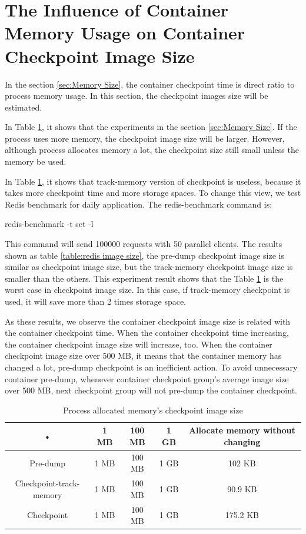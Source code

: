 \section{The Influence of Container Memory Usage on Container Checkpoint Image Size}
In the section \ref{sec:Memory Size}, the container checkpoint time is direct ratio to process memory usage. In this section, the checkpoint images size will be estimated.

In Table \ref{table:process image size}, it shows that the experiments in the section \ref{sec:Memory Size}. If the process uses more memory, the checkpoint image size will be larger. However, although process allocates memory a lot, the checkpoint size still small unless the memory be used.

In Table \ref{table:process image size}, it shows that track-memory version of checkpoint is useless, because it takes more checkpoint time and more storage spaces. To change this view, we test Redis benchmark for daily application. The redis-benchmark command is:
\begin{center}
redis-benchmark -t set -l
\end{center}
This command will send 100000 requests with 50 parallel clients. The results shown as table \ref{table:redis image size}, the pre-dump checkpoint image size is similar as checkpoint image size, but the track-memory checkpoint image size is smaller than the others. This experiment result shows that the Table \ref{table:process image size} is the worst case in checkpoint image size. In this case, if track-memory checkpoint is used, it will save more than 2 times storage space.

As these results, we observe the container checkpoint image size is related with the container checkpoint time.
When the container checkpoint time increasing, the container checkpoint image size will increase, too.
When the container checkpoint image size over 500 MB, it means that the container memory has changed a lot, pre-dump checkpoint is an inefficient action.
To avoid unnecessary container pre-dump, whenever container checkpoint group's average image size over 500 MB, next checkpoint group will not pre-dump the container checkpoint.

\begin{table}[hbtp]
\begin{center}
\begin{tabular}{|c|c|c|c|c|}\hline 
• & 1 MB & 100 MB & 1 GB & Allocate memory without changing\\ 
\hline 
Pre-dump & 1 MB & 100 MB & 1 GB & 102 KB\\ 
\hline 
Checkpoint-track-memory & 1 MB & 100 MB & 1 GB & 90.9 KB \\ 
\hline 
Checkpoint & 1 MB & 100 MB & 1 GB & 175.2 KB \\ 
\hline 
\end{tabular}
\caption{Process allocated memory's checkpoint image size}
\label{table:process image size}
\end{center}
\end{table}

